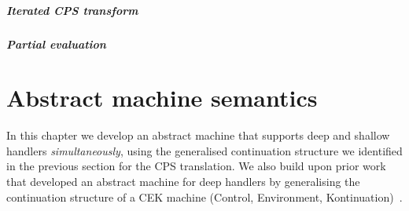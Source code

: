 \documentclass[12pt,phd,lfcs,twoside,openright,logo,leftchapter,normalheadings]{infthesis}
\theoremstyle{plain}
\theoremstyle{definition}
\begin{document}







\paragraph{Iterated CPS transform}

\paragraph{Partial evaluation}

\chapter{Abstract machine semantics}
\label{ch:abstract-machine}

In this chapter we develop an abstract machine that supports deep and
shallow handlers \emph{simultaneously}, using the generalised
continuation structure we identified in the previous section for the
CPS translation. We also build upon prior work~\citep{HillerstromL16}
that developed an abstract machine for deep handlers by generalising
the continuation structure of a CEK machine (Control, Environment,
Kontinuation)~\citep{FelleisenF86}.
%
\end{document}
